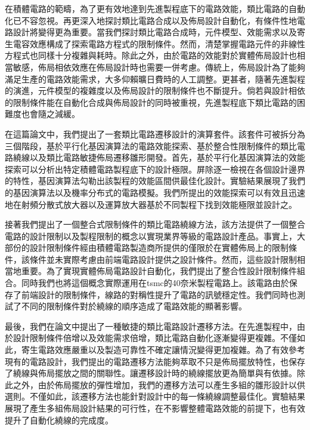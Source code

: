
在積體電路的範疇，為了更有效地達到先進製程底下的電路效能，類比電路的自動化已不容忽視。再更深入地探討類比電路合成以及佈局設計自動化，有條件性地電路設計將變得更為重要。當我們探討類比電路合成時，元件模型、效能需求以及寄生電容效應構成了探索電路方程式的限制條件。然而，清楚掌握電路元件的非線性方程式也同樣十分複雜與耗時。除此之外，由於電路的效能對於實體佈局設計也相當敏感，佈局相依效應在佈局設計時也需要一併考慮。傳統上，佈局設計為了能夠滿足生產的電路效能需求，大多仰賴曠日費時的人工調整。更甚者，隨著先進製程的演進，元件模型的複雜度以及佈局設計的限制條件也不斷提升。倘若與設計相依的限制條件能在自動化合成與佈局設計的同時被重視，先進製程底下類比電路的困難度也會隨之減緩。

在這篇論文中，我們提出了一套類比電路遷移設計的演算套件。該套件可被拆分為三個階段，基於平行化基因演算法的電路效能探索、基於整合性限制條件的類比電路繞線以及類比電路敏捷佈局遷移雛形開發。首先，基於平行化基因演算法的效能探索可以分析出特定積體電路製程底下的設計極限。屏除逐一檢視在各個設計邊界的特性，基因演算法勾勒出該製程的效能區間供最佳化設計。實驗結果展現了我們的基因演算法以及機率分布式的電路模擬。我們所提出的效能探索可以有效且迅速地在射頻分散式放大器以及運算放大器基於不同製程下找到效能極限並設計之。

接著我們提出了一個整合式限制條件的類比電路繞線方法，該方法提供了一個整合電路的設計限制以及製程限制的概念以實現業界等級的電路設計產品。事實上，大部份的設計限制條件經由積體電路製造商所提供的僅限於在實體佈局上的限制條件，該條件並未實際考慮由前端電路設計提供之設計條件。然而，這些設計限制相當地重要。為了實現實體佈局電路設計自動化，我們提出了整合性設計限制條件組合。同時我們也將這個概念實際運用在tsmc的40奈米製程電路上。該電路由於保存了前端設計的限制條件，線路的對稱性提升了電路的訊號穩定性。我們同時也測試了不同的限制條件對於繞線的順序造成了電路效能的顯著影響。

最後，我們在論文中提出了一種敏捷的類比電路設計遷移方法。在先進製程中，由於設計限制條件倍增以及效能需求倍增，類比電路自動化逐漸變得更複雜。不僅如此，寄生電路效應嚴重以及製造可靠性不確定讓情況變得更加複雜。為了有效參考現有的電路設計，我們提出的電路遷移方法能夠萃取不只是佈局擺放特性，也保存了繞線與佈局擺放之間的關聯性。讓遷移設計時的繞線擺放更為簡單與有依據。除此之外，由於佈局擺放的彈性增加，我們的遷移方法可以產生多組的雛形設計以供選則。不僅如此，該遷移方法也能針對設計中的每一條繞線調整最佳化。實驗結果展現了產生多組佈局設計結果的可行性，在不影響整體電路效能的前提下，也有效提升了自動化繞線的完成度。

